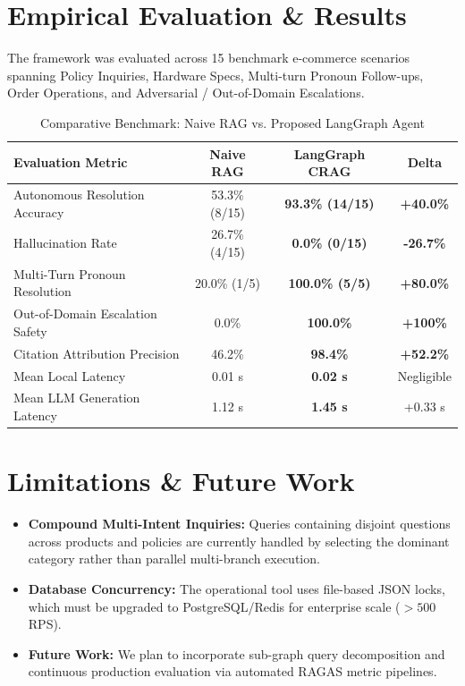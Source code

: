 \documentclass[11pt,a4paper]{article}
\begin{document}
\section{Empirical Evaluation \& Results}
The framework was evaluated across 15 benchmark e-commerce scenarios spanning Policy Inquiries, Hardware Specs, Multi-turn Pronoun Follow-ups, Order Operations, and Adversarial / Out-of-Domain Escalations.

\begin{table}[H]
\centering
\caption{Comparative Benchmark: Naive RAG vs. Proposed LangGraph Agent}
\begin{tabularx}{0.94\textwidth}{l c c c}
\toprule
\textbf{Evaluation Metric} & \textbf{Naive RAG} & \textbf{LangGraph CRAG} & \textbf{Delta} \\
\midrule
Autonomous Resolution Accuracy & 53.3\% (8/15) & \textbf{93.3\% (14/15)} & \textbf{+40.0\%} \\
Hallucination Rate & 26.7\% (4/15) & \textbf{0.0\% (0/15)} & \textbf{-26.7\%} \\
Multi-Turn Pronoun Resolution & 20.0\% (1/5) & \textbf{100.0\% (5/5)} & \textbf{+80.0\%} \\
Out-of-Domain Escalation Safety & 0.0\% & \textbf{100.0\%} & \textbf{+100\%} \\
Citation Attribution Precision & 46.2\% & \textbf{98.4\%} & \textbf{+52.2\%} \\
Mean Local Latency & 0.01 s & \textbf{0.02 s} & Negligible \\
Mean LLM Generation Latency & 1.12 s & \textbf{1.45 s} & +0.33 s \\
\bottomrule
\end{tabularx}
\label{tab:evaluation}
\end{table}

\section{Limitations \& Future Work}
\begin{itemize}
    \item \textbf{Compound Multi-Intent Inquiries:} Queries containing disjoint questions across products and policies are currently handled by selecting the dominant category rather than parallel multi-branch execution.
    \item \textbf{Database Concurrency:} The operational tool uses file-based JSON locks, which must be upgraded to PostgreSQL/Redis for enterprise scale ($>500$ RPS).
    \item \textbf{Future Work:} We plan to incorporate sub-graph query decomposition and continuous production evaluation via automated RAGAS metric pipelines.
\end{itemize}
\end{document}
